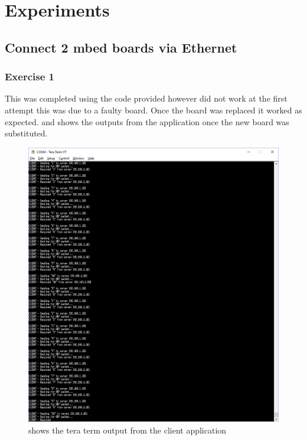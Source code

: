 \documentclass[a4paper,12pt]{scrartcl}
\begin{document}
	\section{Experiments}
	{
		\subsection{Connect 2 mbed boards via Ethernet}
		{
			\subsubsection{Exercise 1}{
				This was completed using the code provided however did not work at the first attempt this was due to a faulty board. Once the board was replaced it worked as expected.  and  shows the outputs from the application once the new board was substituted.
				\begin{figure}
					\centering
					\includegraphics[width=\textwidth]{Client}
					\caption{shows the tera term output from the client application}
					\label{img:ex1-client}
				\end{figure}
				\begin{figure}
					\centering

\end{figure}}}}
\end{document}
